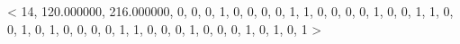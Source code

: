 < 14, 120.000000, 216.000000, 0, 0, 0, 1, 0, 0, 0, 0, 1, 1, 0, 0, 0, 0, 1, 0, 0, 1, 1, 0, 0, 1, 0, 1, 0, 0, 0, 0, 1, 1, 0, 0, 0, 1, 0, 0, 0, 1, 0, 1, 0, 1 > 


